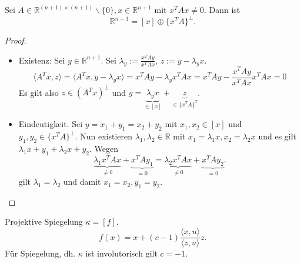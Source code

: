 \documentclass[11pt]{article}
\begin{document}
\begin{theorem}
Sei $A\in \mathbb R^{(n+1)\times(n+1)}\backslash \{0\}, x\in \mathbb R^{n+1}$ mit $x^TAx \neq 0$. Dann ist \begin{equation*}
    \mathbb R^{n+1} = [x] \oplus \{x^TA\}^\perp.
\end{equation*}
\end{theorem}
\begin{proof}
\begin{itemize}
    \item Existenz: Sei $y\in \mathbb R^{n+1}$. Sei $\lambda_y := \frac{x^TAy}{x^TAx}$, $z:= y-\lambda_y x$. 
    \begin{equation*}
        \langle A^Tx, z\rangle = \langle A^Tx, y-\lambda_y x\rangle = x^TAy - \lambda_yx^TAx = x^TAy - \frac{x^TAy}{x^TAx}x^TAx = 0
    \end{equation*}
    Es gilt also $z\in (A^Tx)^\perp$ und $y = \underbrace{\lambda_y x}_{\in [x]} +\underbrace{z}_{\in \{x^TA\}^T}$. 
    \item Eindeutigkeit. Sei $y = x_1+y_1 = x_2 + y_2$ mit $x_1, x_2\in [x]$ und $y_1,y_2\in \{x^TA\}^\perp$. Nun existieren $\lambda_1,\lambda_2\in \mathbb R$ mit $x_1 = \lambda_1x, x_2 = \lambda_2 x$ und es gilt $\lambda_1 x +y_1 + \lambda_2 x + y_2$. Wegen \begin{equation*}
        \underbrace{\lambda_1 x^TAx}_{\neq 0} + \underbrace{x^TAy_1}_{= 0} = \underbrace{\lambda_2x^TAx}_{\neq 0} + \underbrace{x^TAy_2}_{=0}.
    \end{equation*}
    gilt $\lambda_1 = \lambda_2$ und damit $x_1 = x_2, y_1 = y_2$.
\end{itemize}
\end{proof}
\begin{remark}
Projektive Spiegelung $\kappa = [f]$.
\begin{equation*}
    f(x) = x + (c-1) \frac{\langle x,u\rangle}{\langle z, u\rangle}z.
\end{equation*}
Für Spiegelung, dh. $\kappa$ ist involutorisch gilt $c = -1$.
\end{remark}
\end{document}
